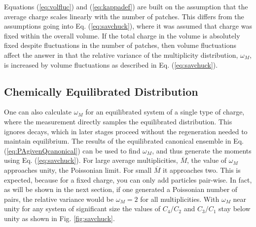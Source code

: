 Equations (\ref{eq:volfluc}) and (\ref{eq:kappadef}) are built on the assumption that the average charge scales linearly with the number of patches. This differs from the assumptions going into Eq. (\ref{eq:savchuck}), where it was assumed that charge was fixed within the overall volume. If the total charge in the volume is absolutely fixed despite fluctuations in the number of patches, then volume fluctuations affect the answer in that the relative variance of the multiplicity distribution, $\omega_M$, is increased by volume fluctuations as described in Eq. (\ref{eq:savchuck}).

\subsection{Chemically Equilibrated Distribution}

One can also calculate $\omega_M$ for an equilibrated system of a single type of charge, where the measurement directly samples the equilibrated distribution. This ignores decays, which in later stages proceed without the regeneration needed to maintain equilibrium. The results of the equilibrated canonical ensemble in Eq. (\ref{eq:PAgivenQcanonical}) can be used to find $\omega_M$, and thus generate the moments using Eq. (\ref{eq:savchuck}). For large average multiplicities, $\overline{M}$, the value of $\omega_M$ approaches unity, the Poissonian limit. For small $\overline{M}$ it approaches two. This is expected, because for a fixed charge, you can only add particles pair-wise. In fact, as will be shown in the next section, if one generated a Poissonian number of pairs, the relative variance would be $\omega_M=2$ for all multiplicities. With $\omega_M$ near unity for any system of significant size the values of $C_4/C_2$ and $C_3/C_1$ stay below unity as shown in Fig. \ref{fig:savchuck}. 

